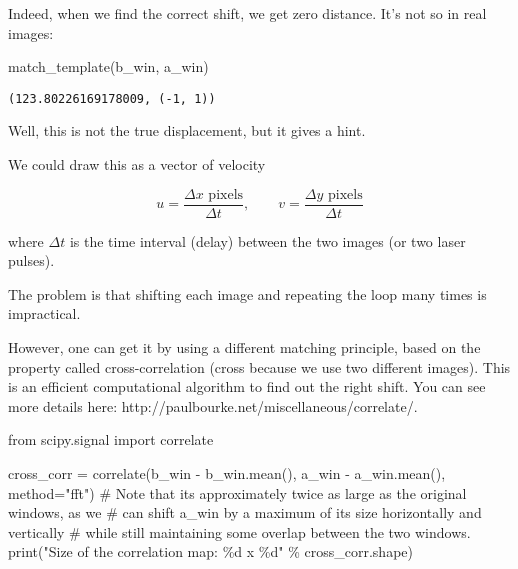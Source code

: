 \documentclass[
  english,
  letterpaper,
  numbers=noendperiod,
  DIV=13]{scrreprt}
\newenvironment{Shaded}{\begin{snugshade}}{\end{snugshade}}
\newcommand{\BuiltInTok}[1]{\textcolor[rgb]{0.00,0.23,0.31}{#1}}
\newcommand{\CommentTok}[1]{\textcolor[rgb]{0.37,0.37,0.37}{#1}}
\newcommand{\ImportTok}[1]{\textcolor[rgb]{0.00,0.46,0.62}{#1}}
\newcommand{\NormalTok}[1]{\textcolor[rgb]{0.00,0.23,0.31}{#1}}
\newcommand{\OperatorTok}[1]{\textcolor[rgb]{0.37,0.37,0.37}{#1}}
\newcommand{\SpecialCharTok}[1]{\textcolor[rgb]{0.37,0.37,0.37}{#1}}
\newcommand{\StringTok}[1]{\textcolor[rgb]{0.13,0.47,0.30}{#1}}
\begin{document}
Indeed, when we find the correct shift, we get zero distance. It's not
so in real images:

\begin{Shaded}
\begin{Highlighting}[]
\NormalTok{match\_template(b\_win, a\_win)}
\end{Highlighting}
\end{Shaded}

\begin{verbatim}
(123.80226169178009, (-1, 1))
\end{verbatim}

Well, this is not the true displacement, but it gives a hint.

We could draw this as a vector of velocity

\[
    u = \frac{\Delta x \text{ pixels}}{\Delta t} ,\qquad v = \frac{\Delta y \text{ pixels}}{\Delta t}
\]

where \(\Delta t\) is the time interval (delay) between the two images
(or two laser pulses).

The problem is that shifting each image and repeating the loop many
times is impractical.

However, one can get it by using a different matching principle, based
on the property called cross-correlation (cross because we use two
different images). This is an efficient computational algorithm to find
out the right shift. You can see more details here:
http://paulbourke.net/miscellaneous/correlate/.

\begin{Shaded}
\begin{Highlighting}[]
\ImportTok{from}\NormalTok{ scipy.signal }\ImportTok{import}\NormalTok{ correlate}

\NormalTok{cross\_corr }\OperatorTok{=}\NormalTok{ correlate(b\_win }\OperatorTok{{-}}\NormalTok{ b\_win.mean(), a\_win }\OperatorTok{{-}}\NormalTok{ a\_win.mean(), method}\OperatorTok{=}\StringTok{"fft"}\NormalTok{)}
\CommentTok{\# Note that it\textquotesingle{}s approximately twice as large as the original windows, as we}
\CommentTok{\# can shift a\_win by a maximum of its size horizontally and vertically}
\CommentTok{\# while still maintaining some overlap between the two windows.}
\BuiltInTok{print}\NormalTok{(}\StringTok{"Size of the correlation map: }\SpecialCharTok{\%d}\StringTok{ x }\SpecialCharTok{\%d}\StringTok{"} \OperatorTok{\%}\NormalTok{ cross\_corr.shape)}
\end{Highlighting}
\end{Shaded}
\end{document}
